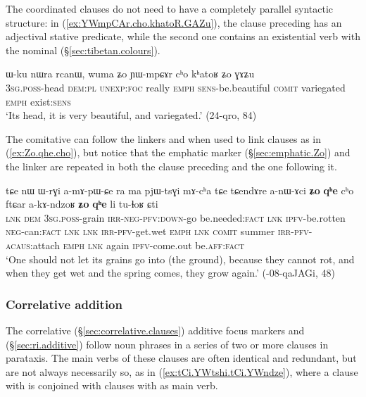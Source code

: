  The coordinated clauses do not need to have a completely parallel syntactic structure: in (\ref{ex:YWmpCAr.cho.khatoR.GAZu}), the clause preceding  has an adjectival stative predicate, while the second one contains an existential verb with the nominal  (§\ref{sec:tibetan.colours}).
 
\begin{exe}
\ex \label{ex:YWmpCAr.cho.khatoR.GAZu}
\gll   ɯ-ku nɯra rcanɯ, wuma ʑo ɲɯ-mpɕɤr cʰo kʰatoʁ ʑo ɣɤʑu \\
\textsc{3sg}.\textsc{poss}-head \textsc{dem}:\textsc{pl} \textsc{unexp}:\textsc{foc} really \textsc{emph} \textsc{sens}-be.beautiful \textsc{comit} variegated \textsc{emph} exist:\textsc{sens} \\
\glt `Its head, it is very beautiful, and variegated.' (24-qro, 84)
\end{exe}

The comitative  can follow the linkers  and  when used to link clauses as in (\ref{ex:Zo.qhe.cho}), but notice that the emphatic marker (§\ref{sec:emphatic.Zo}) and the linker  are repeated in both the clause preceding  and the one following it.

\begin{exe}
\ex \label{ex:Zo.qhe.cho}
\gll tɕe nɯ ɯ-rɣi a-mɤ-pɯ-ɕe ra ma pjɯ-tsɣi mɤ-cʰa tɕe tɕendɤre a-nɯ-ɤci \textbf{ʑo} \textbf{qʰe} cʰo ftɕar a-kɤ-ndzoʁ \textbf{ʑo} \textbf{qʰe} li tu-ɬoʁ ɕti \\
\textsc{lnk} \textsc{dem} \textsc{3sg}.\textsc{poss}-grain \textsc{irr}-\textsc{neg}-\textsc{pfv}:\textsc{down}-go be.needed:\textsc{fact} \textsc{lnk} \textsc{ipfv}-be.rotten \textsc{neg}-can:\textsc{fact} \textsc{lnk} \textsc{lnk} \textsc{irr}-\textsc{pfv}-get.wet \textsc{emph} \textsc{lnk} \textsc{comit} summer \textsc{irr}-\textsc{pfv}-\textsc{acaus}:attach \textsc{emph} \textsc{lnk} again \textsc{ipfv}-come.out be.\textsc{aff}:\textsc{fact} \\
\glt `One should not let its grains go into (the ground), because they cannot rot, and when they get wet and the spring comes, they grow again.' (-08-qaJAGi, 48)
\end{exe}

 \subsubsection{Correlative addition} \label{sec:correlative.addition}
The correlative (§\ref{sec:correlative.clauses}) additive focus markers  and  (§\ref{sec:ri.additive}) follow noun phrases in a series of two or more clauses in parataxis. The main verbs of these clauses are often identical and redundant, but are not always necessarily so, as in (\ref{ex:tCi.YWtshi.tCi.YWndze}), where a clause with  is conjoined with clauses with  as main verb.

